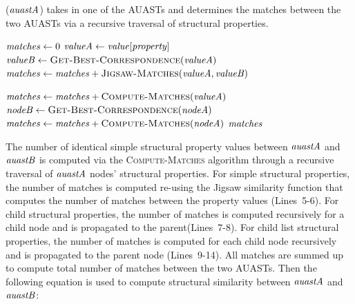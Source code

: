 \begin{algorithm}
  \caption{($\mathit{auastA}$) takes in one of the AUASTs and determines the matches between the two AUASTs via a recursive traversal of structural properties.}
  \label{computeMatches}
  \begin{algorithmic}[1]
  \ComputeMatch
         \State $\mathit{matches} \gets 0$
	\State $\mathit{valueA} \gets \mathit{value}[\mathit{property}]$
	\State $\mathit{valueB} \gets \textsc{Get-Best-Correspondence}(\mathit{valueA})$
 \State $\mathit{matches} \gets  \mathit{matches} + \textsc{Jigsaw-Matches}(\mathit{valueA}, \mathit{valueB})$ 	
	
	          \State $\mathit{matches} \gets  \mathit{matches} +\textsc{Compute-Matches}(\mathit{valueA})$		
		\State $\mathit{nodeB} \gets \textsc{Get-Best-Correspondence}(\mathit{nodeA})$
	 \State $\mathit{matches} \gets  \mathit{matches} + \textsc{Compute-Matches}(\mathit{nodeA})$
	  \EndFor 	
	   \EndIf
       \EndFor 	
	\Return $\mathit{matches}$
  \end{algorithmic}
\end{algorithm}

The number of identical simple structural property values between $\mathit{auastA}$ and $\mathit{auastB}$ is computed via the \textsc{Compute-Matches} algorithm through a recursive traversal of $\mathit{auastA}$ nodes' structural properties. For simple structural properties, the number of matches is computed re-using the Jigsaw similarity function that computes the number of matches between the property values (Lines~5-6). For child structural properties, the number of matches is computed recursively for a child node and is propagated to the parent(Lines~7-8). For child list structural properties, the number of matches is computed for each child node recursively and is propagated to the parent node (Lines~9-14). All matches are summed up to compute total number of matches between the two AUASTs. Then the following equation is used to compute structural similarity between $\mathit{auastA}$ and $\mathit{auastB}$:

